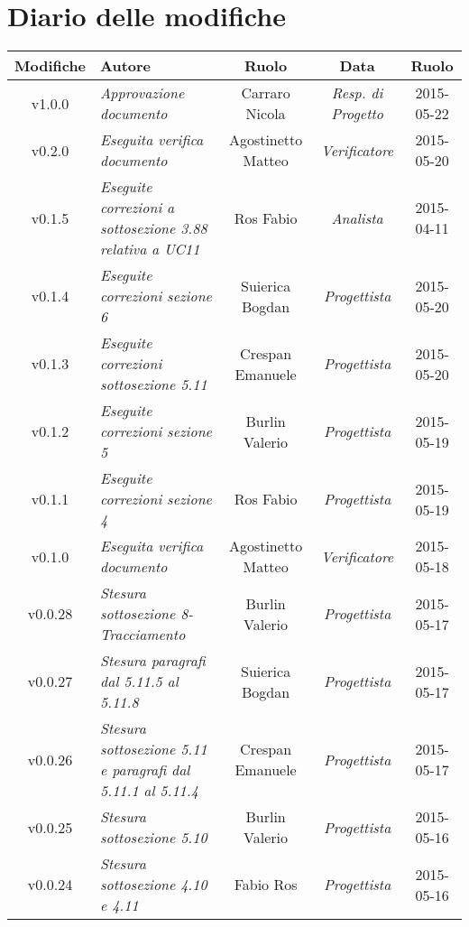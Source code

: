 \newpage
\section*{Diario delle modifiche}

\begin{table}[h]
\centering
\begin{tabular}{|c|p{}|c|c|c|}
	\toprule
		\textbf{Modifiche} & \textbf{Autore} & \textbf{Ruolo} & \textbf{Data} & \textbf{Ruolo} \\
	\midrule
		v1.0.0 & \textit{Approvazione documento} & Carraro Nicola & \textit{Resp. di Progetto} & 2015-05-22\\
	\midrule
		v0.2.0 & \textit{Eseguita verifica documento} & Agostinetto Matteo & \textit{Verificatore} & 2015-05-20\\
	\midrule
		v0.1.5 & \textit{Eseguite correzioni a sottosezione 3.88 relativa a UC11} & Ros Fabio & \textit{Analista} & 2015-04-11\\
	\midrule
		v0.1.4 & \textit{Eseguite correzioni sezione 6} & Suierica Bogdan & \textit{Progettista} & 2015-05-20\\
	\midrule
		v0.1.3 & \textit{Eseguite correzioni sottosezione 5.11} & Crespan Emanuele & \textit{Progettista} & 2015-05-20\\
	\midrule
		v0.1.2 & \textit{Eseguite correzioni sezione 5} & Burlin Valerio & \textit{Progettista} & 2015-05-19\\
	\midrule
		v0.1.1 & \textit{Eseguite correzioni sezione 4} & Ros Fabio & \textit{Progettista} & 2015-05-19\\
	\midrule
		v0.1.0 & \textit{Eseguita verifica documento} & Agostinetto Matteo & \textit{Verificatore} & 2015-05-18\\
	\midrule
		v0.0.28 & \textit{Stesura sottosezione 8-Tracciamento} & Burlin Valerio & \textit{Progettista} & 2015-05-17\\
	\midrule
		v0.0.27 & \textit{Stesura paragrafi dal 5.11.5 al 5.11.8} & Suierica Bogdan & \textit{Progettista} & 2015-05-17\\
	\midrule
		v0.0.26 & \textit{Stesura sottosezione 5.11 e paragrafi dal 5.11.1 al 5.11.4} & Crespan Emanuele & \textit{Progettista} & 2015-05-17\\
	\midrule
		v0.0.25 & \textit{Stesura sottosezione 5.10} & Burlin Valerio & \textit{Progettista} & 2015-05-16\\
	\midrule
		v0.0.24 & \textit{Stesura sottosezione 4.10 e 4.11} & Fabio Ros & \textit{Progettista} & 2015-05-16\\

\end{tabular}
\end{table}
